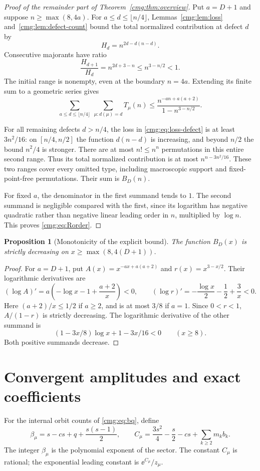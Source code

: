 \documentclass[11pt,letterpaper]{article}
\numberwithin{equation}{section}
\newtheorem{proposition}[theorem]{Proposition}
\theoremstyle{definition}\newtheorem{definition}[theorem]{Definition}
\theoremstyle{remark}\newtheorem{remark}[theorem]{Remark}
\begin{document}
\begin{proof}[Proof of the remainder part of Theorem~\ref{cmg:thm:overview}]
Put $a=D+1$ and suppose $n\ge\max(8,4a)$. For $a\le d\le\lfloor n/4\rfloor$, Lemmas~\ref{cmg:lem:loss} and~\ref{cmg:lem:defect-count} bound the total normalized contribution at defect $d$ by
\[
 H_d=n^{2d-d(n-d)}.
\]
Consecutive majorants have ratio
\[
 \frac{H_{d+1}}{H_d}=n^{2d+3-n}\le n^{3-n/2}<1.
\]
The initial range is nonempty, even at the boundary $n=4a$. Extending its finite sum to a geometric series gives
\begin{equation}\label{cmg:eq:small-defect-tail}
 \sum_{a\le d\le\lfloor n/4\rfloor}\ \sum_{\mu:d(\mu)=d}T_\mu(n)
 \le\frac{n^{-an+a(a+2)}}{1-n^{3-n/2}}.
\end{equation}

For all remaining defects $d>n/4$, the loss in \eqref{cmg:eq:loss-defect} is at least $3n^2/16$: on $[n/4,n/2]$ the function $d(n-d)$ is increasing, and beyond $n/2$ the bound $n^2/4$ is stronger. There are at most $n!\le n^n$ permutations in this entire second range. Thus its total normalized contribution is at most $n^{n-3n^2/16}$. These two ranges cover every omitted type, including macroscopic support and fixed-point-free permutations. Their sum is $B_D(n)$.

For fixed $a$, the denominator in the first summand tends to $1$. The second summand is negligible compared with the first, since its logarithm has negative quadratic rather than negative linear leading order in $n$, multiplied by $\log n$. This proves \eqref{cmg:eq:Rorder}.
\end{proof}

\begin{proposition}[Monotonicity of the explicit bound]\label{cmg:prop:Bdecreasing}
The function $B_D(x)$ is strictly decreasing on $x\ge\max(8,4(D+1))$.
\end{proposition}
\begin{proof}
For $a=D+1$, put $A(x)=x^{-ax+a(a+2)}$ and $r(x)=x^{3-x/2}$. Their logarithmic derivatives are
\[
 (\log A)'=a\left(-\log x-1+\frac{a+2}{x}\right)<0,
 \qquad
 (\log r)'=-\frac{\log x}{2}-\frac12+\frac3x<0.
\]
Here $(a+2)/x\le1/2$ if $a\ge2$, and is at most $3/8$ if $a=1$. Since $0<r<1$, $A/(1-r)$ is strictly decreasing. The logarithmic derivative of the other summand is
\[
 (1-3x/8)\log x+1-3x/16<0\qquad(x\ge8).
\]
Both positive summands decrease.
\end{proof}

\section{Convergent amplitudes and exact coefficients}\label{cmg:sec:amplitudes}
For the internal orbit counts of \eqref{cmg:eq:bq}, define
\begin{equation}\label{cmg:eq:betaC}
 \beta_\mu=s-cs+q+\frac{s(s-1)}2,\qquad
 C_\mu=\frac{3s^2}4-\frac s2-cs+\sum_{k\ge2}m_k b_k.
\end{equation}
The integer $\beta_\mu$ is the polynomial exponent of the sector. The constant $C_\mu$ is rational; the exponential leading constant is $\ee^{C_\mu}/z_\mu$.
\end{document}
